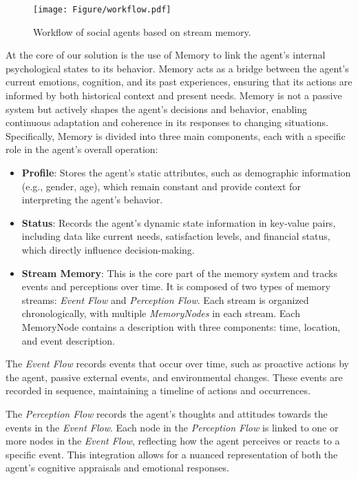 \begin{figure}[ht]
\centering
\texttt{[image: Figure/workflow.pdf]}
\caption{Workflow of social agents based on stream memory.}
\label{fig:workflow}
\end{figure}

At the core of our solution is the use of Memory to link the agent’s internal psychological states to its behavior. Memory acts as a bridge between the agent’s current emotions, cognition, and its past experiences, ensuring that its actions are informed by both historical context and present needs. Memory is not a passive system but actively shapes the agent’s decisions and behavior, enabling continuous adaptation and coherence in its responses to changing situations. Specifically, Memory is divided into three main components, each with a specific role in the agent's overall operation:

\begin{itemize}
    \item \textbf{Profile}: Stores the agent's static attributes, such as demographic information (e.g., gender, age), which remain constant and provide context for interpreting the agent's behavior.
    \item \textbf{Status}: Records the agent's dynamic state information in key-value pairs, including data like current needs, satisfaction levels, and financial status, which directly influence decision-making.
    \item \textbf{Stream Memory}: This is the core part of the memory system and tracks events and perceptions over time. It is composed of two types of memory streams: \textit{Event Flow} and \textit{Perception Flow}. Each stream is organized chronologically, with multiple \textit{MemoryNodes} in each stream. Each MemoryNode contains a description with three components: time, location, and event description. 
\end{itemize}

The \textit{Event Flow} records events that occur over time, such as proactive actions by the agent, passive external events, and environmental changes. These events are recorded in sequence, maintaining a timeline of actions and occurrences.

The \textit{Perception Flow} records the agent's thoughts and attitudes towards the events in the \textit{Event Flow}. Each node in the \textit{Perception Flow} is linked to one or more nodes in the \textit{Event Flow}, reflecting how the agent perceives or reacts to a specific event. This integration allows for a nuanced representation of both the agent's cognitive appraisals and emotional responses. 

